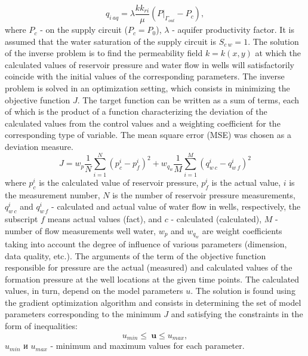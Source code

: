 \documentclass[
11pt,%
tightenlines,%
twoside,%
onecolumn,%
nofloats,%
nobibnotes,%
nofootinbib,%
superscriptaddress,%
noshowpacs,%
centertags]%
{revtex4}
\begin{document}
\begin{equation*} \label{qaq}
q_{i\:aq} = \lambda \frac{kk_{ri}}{\mu}(P|_{\Gamma_{out}}-P_c),
\end{equation*}
where $P_{c}$ - on the supply circuit ($P_c = P_0$), $\lambda$ - aquifer productivity factor. It is assumed that the water saturation of the supply circuit is $S_{c\:w} = 1$.
The solution of the inverse problem is to find the permeability field $k = k(x,y)$ at which the calculated values of reservoir pressure and water flow in wells will satisfactorily coincide with the initial values of the corresponding parameters. The inverse problem is solved in an optimization setting, which consists in minimizing the objective function $J$. The target function can be written as a sum of terms, each of which is the product of a function characterizing the deviation of the calculated values from the control values and a weighting coefficient for the corresponding type of variable. The mean square error (MSE) was chosen as a deviation measure.
\begin{equation} \label{mse}
	J=w_p\frac{1}{N}\sum_{i=1}^N{\left(p_c^i-p_f^i\right)^2}+w_{q_w}\frac{1}{M}\sum_{i=1}^M{\left(q_{w\:c}^i-q_{w\:f}^i\right)^2}
\end{equation}
where $p_c^i$ is the calculated value of reservoir pressure, $p_f^i$ is the actual value, $i$ is the measurement number, $N$ is the number of reservoir pressure measurements, $q_{w\:c}^i$ and $ q_{w\:f}^i$ - calculated and actual value of water flow in wells, respectively, the subscript $f$ means actual values (fact), and $c$ - calculated (calculated), $M$ - number of flow measurements well water, $w_p$ and $w_{q_w}$ are weight coefficients taking into account the degree of influence of various parameters (dimension, data quality, etc.). The arguments of the term of the objective function responsible for pressure are the actual (measured) and calculated values of the formation pressure at the well locations at the given time points.
 The calculated values, in turn, depend on the model parameters $u$. The solution is found using the gradient optimization algorithm and consists in determining the set of model parameters corresponding to the minimum $J$ and satisfying the constraints in the form of inequalities:
\begin{equation*}
u_{min}\leq\ \boldsymbol{u}\leq u_{max},
\end{equation*}
$u_{min}$ и $u_{max}$ - minimum and maximum values for each parameter.
\end{document}
